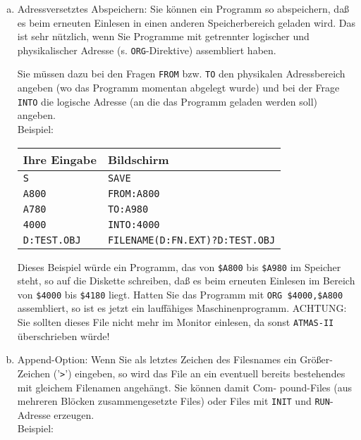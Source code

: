 \documentclass[10pt,a4paper,twoside,final,openright,titlepage]{memoir}
\def\atmas{\texttt{AT\-MAS-II }}
\begin{document}
\begin{enumerate}[a)]
\item Adressversetztes Abspeichern: Sie können ein Programm
so abspeichern, daß es beim erneuten Einlesen in
einen anderen Speicherbereich geladen wird. Das ist
sehr nützlich, wenn Sie Programme mit getrennter logischer
und physikalischer Adresse (s. \texttt{ORG}-Direktive)
assembliert haben.

Sie müssen dazu bei den Fragen \texttt{FROM} bzw. \texttt{TO} den
physikalen Adressbereich angeben (wo das Programm momentan
abgelegt wurde) und bei der Frage \texttt{INTO} die logische
Adresse (an die das Programm geladen werden soll)
angeben.\\

Beispiel: \\

\renewcommand{\arraystretch}{1.2}
\begin{tabular}{p{10em}p{18em}}
Ihre Eingabe	& Bildschirm \\ \hline
\texttt{S}				& \texttt{SAVE} \\
\texttt{A800}			& \texttt{FROM:A800} \\
\texttt{A780} 			& \texttt{TO:A980} \\
\texttt{4000}			& \texttt{INTO:4000} \\
\texttt{D:TEST.OBJ}		& \texttt{FILENAME(D:FN.EXT)?D:TEST.OBJ} \\
\end{tabular}
\renewcommand{\arraystretch}{1.8}
\bigskip

Dieses Beispiel würde ein Programm, das von \texttt{\$A800} bis
\texttt{\$A980} im Speicher steht, so auf die Diskette schreiben,
daß es beim erneuten Einlesen im Bereich von
\texttt{\$4000} bis \texttt{\$4180} liegt. Hatten Sie das Programm mit
\texttt{ORG \$4000,\$A800} assem\-bliert, so ist es jetzt ein
lauffähiges Ma\-schi\-nen\-pro\-gramm. ACHTUNG: Sie sollten
dieses File nicht mehr im Monitor einlesen, da sonst
\atmas überschrieben würde!

\item Append-Option: Wenn Sie als letztes Zeichen des
Filesnames ein Größer-Zeichen ('\texttt{>}') eingeben, so wird
das File an ein eventuell bereits bestehendes mit
gleichem Filenamen angehängt. Sie können damit Com-
pound-Files (aus mehreren Blöcken zusammengesetzte
Files) oder Files mit \texttt{INIT} und \texttt{RUN}-Adresse erzeugen.\\

Beispiel: \\


\end{enumerate}
\end{document}
